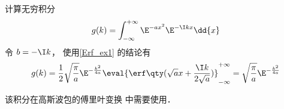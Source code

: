 \begin{example}{}
计算无穷积分
\begin{equation}
g(k) = \int_{-\infty}^{+\infty} \E^{-a x^2} \E^{-\I kx} \dd{x}
\end{equation}
令 $b = -\I k$， 使用\autoref{Erf_ex1} 的结论有
\begin{equation}
g(k) = \frac12 \sqrt{\frac{\pi}{a}} \E^{-\frac{k^2}{4a}} \eval{\erf\qty(\sqrt{a} x + \frac{\I k}{2\sqrt{a}})}_{-\infty}^{+\infty} = \sqrt{\frac{\pi}{a}} \E^{-\frac{k^2}{4a}}
\end{equation}

该积分在高斯波包的傅里叶变换%
中需要使用．
\end{example}
